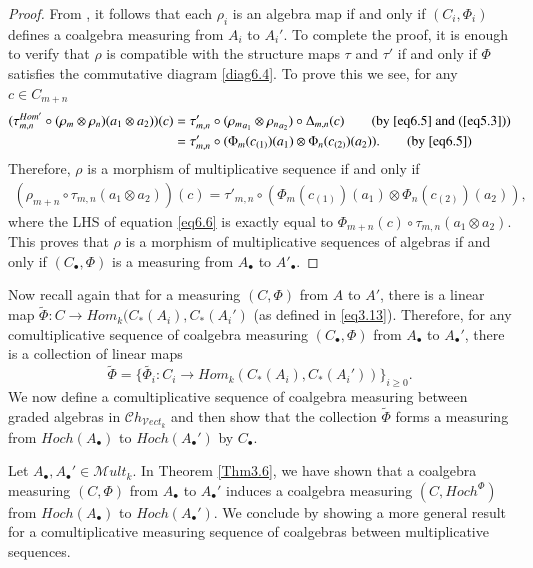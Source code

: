 \documentclass[10pt, colorlinks]{article}
\numberwithin{equation}{section} \DeclareMathSizes{2}{10}{12}{13}
\begin{document}
    \begin{proof}
        From \cite[]{SW}, it follows that each $\rho_i$ is an algebra map if and only if $(C_i,\Phi_i)$ defines a coalgebra measuring from $A_i$ to $A_i'$. To complete the proof, it is enough to verify that $\rho$ is compatible with the structure maps $\tau$ and $\tau'$ if and only if $\Phi$ satisfies the commutative diagram \eqref{diag6.4}. To prove this we see, for any $c\in C_{m+n}$
\begin{align*}
    (\tau^{ {Hom}'}_{m,n}\circ (\rho_m \otimes \rho_{n})(a_1\otimes a_2))(c) &=\tau'_{m,n}\circ ({\rho_m}_{a_1} \otimes {\rho_{n}}_{a_2})\circ\Delta_{m,n}(c)\tag{by \eqref{eq6.5} and (\ref{eq5.3})}\\
    &=\tau'_{m,n}\circ (\Phi_m(c_{(1)})(a_1)\otimes\Phi_n(c_{(2)})(a_2)).\tag{by \eqref{eq6.5}}
\end{align*}
Therefore, $\rho$ is a morphism of multiplicative sequence if and only if
\begin{align}\label{eq6.6}
    (\rho_{m+n}\circ \tau_{m,n}(a_1\otimes a_2))(c)=\tau'_{m,n}\circ (\Phi_m(c_{(1)})(a_1)\otimes\Phi_n(c_{(2)})(a_2)),
\end{align}
where the LHS of equation \eqref{eq6.6} is exactly equal to $\Phi_{m+n}(c)\circ \tau_{m,n}(a_1\otimes a_2)$.
This proves that $\rho$ is a morphism of multiplicative sequences of algebras if and only if $(C_\bullet,\Phi)$ is a measuring from $A_\bullet$ to $A'_\bullet$.
    \end{proof}
      
    Now recall again that for a measuring $(C,\Phi)$ from $A$ to $A'$, there is a linear map $\widetilde{\Phi}:C\longrightarrow  {Hom}_k(C_*(A_i),C_*(A_i')$ (as defined in \eqref{eq3.13}). Therefore, for any comultiplicative sequence of coalgebra measuring $(C_\bullet,\Phi)$ from $A_\bullet$ to $A_\bullet'$, there is a collection of linear maps 
    \begin{equation}\label{eq6.7}
    \widetilde{\Phi}=\{\widetilde{\Phi_i}:C_i\longrightarrow  {Hom}_k(C_*(A_i),C_*(A_i'))\}_{i\geq 0}.
    \end{equation}
    We now define a comultiplicative sequence of coalgebra measuring between graded algebras in $\mathcal Ch_{\mathcal{ V}ect_k}$ and then show that the collection $\widetilde{\Phi}$ forms a measuring from $Hoch(A_\bullet)$ to $Hoch(A_\bullet')$ by $C_\bullet$.
      \fi






    Let $A_\bullet,A_\bullet'\in \mathscr Mult_k$.    In Theorem \ref{Thm3.6}, we have shown  that a coalgebra measuring $(C,\Phi)$ from $A_\bullet$ to $A_\bullet'$ induces a coalgebra measuring $(C,Hoch^\Phi)$ from $Hoch(A_\bullet)$ to $Hoch(A_\bullet')$. We conclude   by showing a more general result for a comultiplicative measuring sequence of coalgebras between multiplicative sequences.
\end{document}
